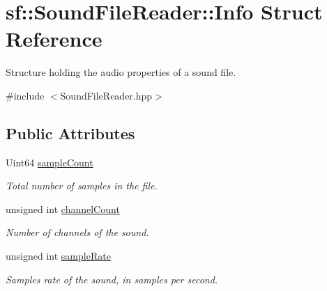 \hypertarget{structsf_1_1_sound_file_reader_1_1_info}{}\section{sf\+:\+:Sound\+File\+Reader\+:\+:Info Struct Reference}
\label{structsf_1_1_sound_file_reader_1_1_info}


Structure holding the audio properties of a sound file.  




{\ttfamily \#include $<$Sound\+File\+Reader.\+hpp$>$}

\subsection*{Public Attributes}
\begin{DoxyCompactItemize}
\item 
\mbox{\label{structsf_1_1_sound_file_reader_1_1_info_a74b40b4693d7000571484736d1367167}} 
Uint64 \mbox{\hyperlink{structsf_1_1_sound_file_reader_1_1_info_a74b40b4693d7000571484736d1367167}{sample\+Count}}
\begin{DoxyCompactList}\small\item\em Total number of samples in the file. \end{DoxyCompactList}\item 
\mbox{\label{structsf_1_1_sound_file_reader_1_1_info_ac748bb30768d1a3caf329e95d31d6d2a}} 
unsigned int \mbox{\hyperlink{structsf_1_1_sound_file_reader_1_1_info_ac748bb30768d1a3caf329e95d31d6d2a}{channel\+Count}}
\begin{DoxyCompactList}\small\item\em Number of channels of the sound. \end{DoxyCompactList}\item 
\mbox{\label{structsf_1_1_sound_file_reader_1_1_info_a06ef71c19e7de190b294ae02c361f752}} 
unsigned int \mbox{\hyperlink{structsf_1_1_sound_file_reader_1_1_info_a06ef71c19e7de190b294ae02c361f752}{sample\+Rate}}
\begin{DoxyCompactList}\small\item\em Samples rate of the sound, in samples per second. \end{DoxyCompactList}\end{DoxyCompactItemize}


